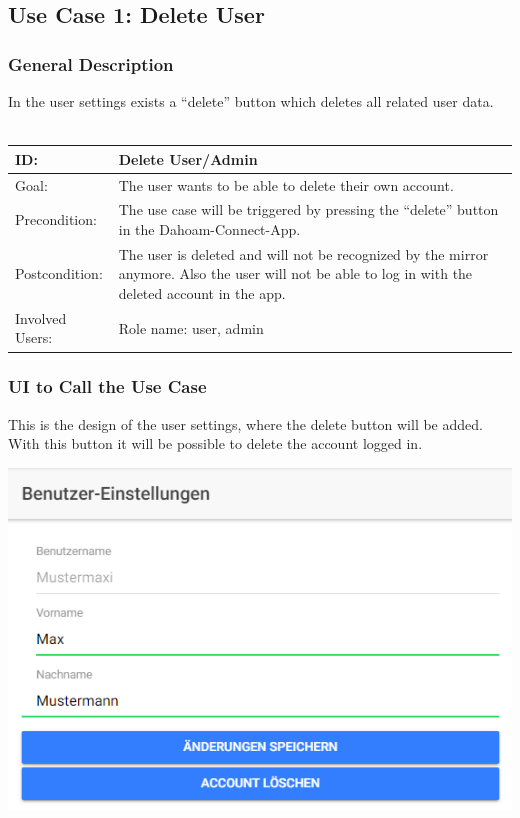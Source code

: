\documentclass[12pt]{article}
\theoremstyle{definition}
\begin{document}
\subsection{Use Case 1: Delete User}
\subsubsection{General Description}
In the user settings exists a ``delete'' button which deletes all related user data.
\\
\\
\begin{tabular}{|p{.2\linewidth}|p{.65\linewidth}|}
\hline 
ID: & Delete User/Admin \\ \hline
Goal: & The user wants to be able to delete their own account. \\ \hline
Precondition: & The use case will be triggered by pressing the ``delete'' button in the Dahoam-Connect-App. \\ \hline
Postcondition: & The user is deleted and will not be recognized by the mirror anymore. Also the user will not be able to log in with the deleted account in the app. \\ \hline
Involved Users: & Role name: user, admin  \\ \hline
\end{tabular}

\subsubsection{UI to Call the Use Case}
This is the design of the user settings, where the delete button will be added. With this button it will be possible to delete the account logged in.

\begin{center}
\includegraphics[scale=.8]{UseCase/DeleteUserFirstStep.PNG}\\
\end{center}
\end{document}
